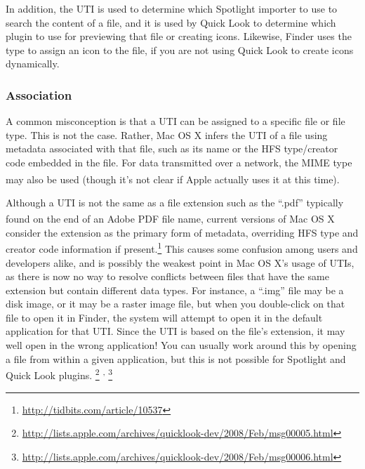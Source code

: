 \documentclass[11pt]{article}
\newcommand*{\apple}{Apple\textsuperscript{\textregistered}\xspace}
\begin{document}
In addition, the UTI is used to determine which Spotlight importer to use
to search the content of a file, and it is used by Quick Look to determine
which plugin to use for previewing that file or creating icons. Likewise,
Finder uses the type to assign an icon to the file, if you are not using
Quick Look to create icons dynamically.

\subsubsection{Association}
A common misconception is that a UTI can be assigned to a specific 
file or file type. This is not the case. Rather, Mac OS X infers the UTI of a file
using metadata associated with that file, such as its name or the HFS type/creator
code embedded in the file. 
For data transmitted over a network, the MIME type may also be used
(though it's not clear if \apple actually uses it at this time).

Although a UTI is not the same as a file extension such as the “.pdf” typically
found on the end of an Adobe\textsuperscript{\textregistered} PDF file name,
current versions of Mac OS X consider the extension as the primary
form of metadata, overriding HFS type and creator code information if
present.\footnote{\url{http://tidbits.com/article/10537}} This causes
some confusion among users and developers alike, and is possibly the weakest 
point in Mac OS X's usage of UTIs, as there is now no way to resolve 
conflicts between files that have the same extension
but contain different data types. For instance, a “.img” file may
be a disk image, or it may be a raster image file, but when you double-click on
that file to open it in Finder, the system will attempt to open it in the default
application for that UTI. Since the UTI is based on the file's extension,
it may well open in the wrong application! You can usually work around this
by opening a file from within a given application, but this is not possible for
Spotlight and Quick Look plugins.%
\footnote{\url{http://lists.apple.com/archives/quicklook-dev/2008/Feb/msg00005.html}}%
\textsuperscript{,}%
\footnote{\url{http://lists.apple.com/archives/quicklook-dev/2008/Feb/msg00006.html}}
\end{document}
